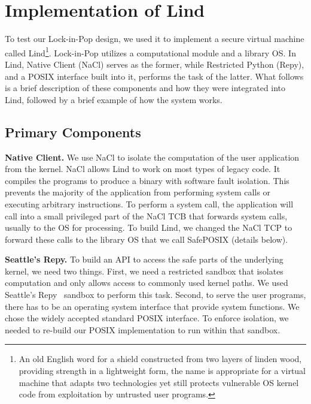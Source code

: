 \section{Implementation of Lind}
\label{sec.implementation}

To test our Lock-in-Pop design, we used it to implement a secure virtual machine
called Lind\footnote{\scriptsize An old English word for a shield constructed from two layers of
linden wood, providing strength in a lightweight form, the name is appropriate for
a virtual machine that adapts two technologies\textendash
yet still protects vulnerable OS kernel code from exploitation by
untrusted user programs.}.
Lock-in-Pop utilizes a
computational module and a library OS. In Lind, Native Client (NaCl) serves as the former,
while Restricted Python (Repy), and a POSIX interface built into it, performs the task of the latter.
What follows is a brief description of these components and how they were integrated
into Lind, followed by a brief example of how the system works.

\subsection{Primary Components}

\textbf{Native Client.}
We use NaCl to isolate the computation of the user application
from the kernel. NaCl allows Lind to work on most types of legacy code.
It compiles the programs to produce a binary with software fault isolation.
This prevents the majority of the application from performing system calls
or executing arbitrary instructions.
To perform a system call, the application will call into a small privileged
part of the NaCl TCB that forwards system calls, usually to the OS for
processing. To build Lind, we changed the NaCl TCP to
forward these calls to the library OS that we call SafePOSIX (details below).

\textbf{Seattle's Repy.}
To build an API to access the safe parts of the underlying kernel, we need
two things. First, we need a restricted sandbox that isolates computation
and only allows access to commonly used kernel paths.  We used
Seattle's Repy~\cite{Repy-10} sandbox to perform this task.
Second, to serve the user programs, there has to be an operating system interface that
provide system functions. We chose the widely accepted standard POSIX interface.
To enforce isolation, we needed to re-build our POSIX implementation to run
within that sandbox.

